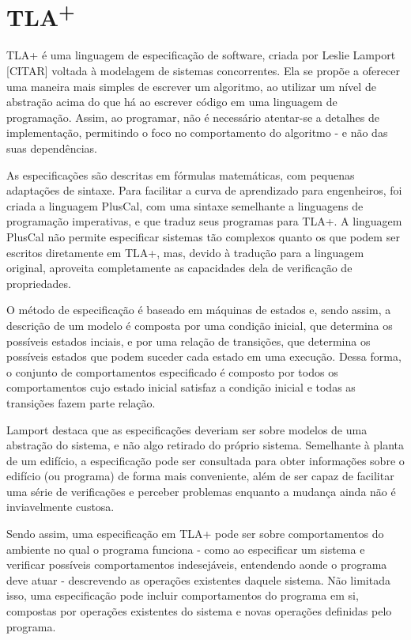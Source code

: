 \chapter{TLA\textsuperscript{+}}
\label{cap2}

TLA+ é uma linguagem de especificação de software, criada por Leslie Lamport [CITAR] voltada à modelagem de sistemas concorrentes. Ela se propõe a oferecer uma maneira mais simples de escrever um algoritmo, ao utilizar um nível de abstração acima do que há ao escrever código em uma linguagem de programação. Assim, ao programar, não é necessário atentar-se a detalhes de implementação, permitindo o foco no comportamento do algoritmo - e não das suas dependências.

As especificações são descritas em fórmulas matemáticas, com pequenas adaptações de sintaxe. Para facilitar a curva de aprendizado para engenheiros, foi criada a linguagem PlusCal, com uma sintaxe semelhante a linguagens de programação imperativas, e que traduz seus programas para TLA+. A linguagem PlusCal não permite especificar sistemas tão complexos quanto os que podem ser escritos diretamente em TLA+, mas, devido à tradução para a linguagem original, aproveita completamente as capacidades dela de verificação de propriedades.

O método de especificação é baseado em máquinas de estados e, sendo assim, a descrição de um modelo é composta por uma condição inicial, que determina os possíveis estados inciais, e por uma relação de transições, que determina os possíveis estados que podem suceder cada estado em uma execução. Dessa forma, o conjunto de comportamentos especificado é composto por todos os comportamentos cujo estado inicial satisfaz a condição inicial e todas as transições fazem parte relação.

Lamport destaca \cite{hyperbook} que as especificações deveriam ser sobre modelos de uma abstração do sistema, e não algo retirado do próprio sistema. Semelhante à planta de um edifício, a especificação pode ser consultada para obter informações sobre o edifício (ou programa) de forma mais conveniente, além de ser capaz de facilitar uma série de verificações e perceber problemas enquanto a mudança ainda não é inviavelmente custosa.

Sendo assim, uma especificação em TLA+ pode ser sobre comportamentos do ambiente no qual o programa funciona - como ao especificar um sistema e verificar possíveis comportamentos indesejáveis, entendendo aonde o programa deve atuar - descrevendo as operações existentes daquele sistema. Não limitada isso, uma especificação pode incluir  comportamentos do programa em si, compostas por operações existentes do sistema e novas operações definidas pelo programa.

